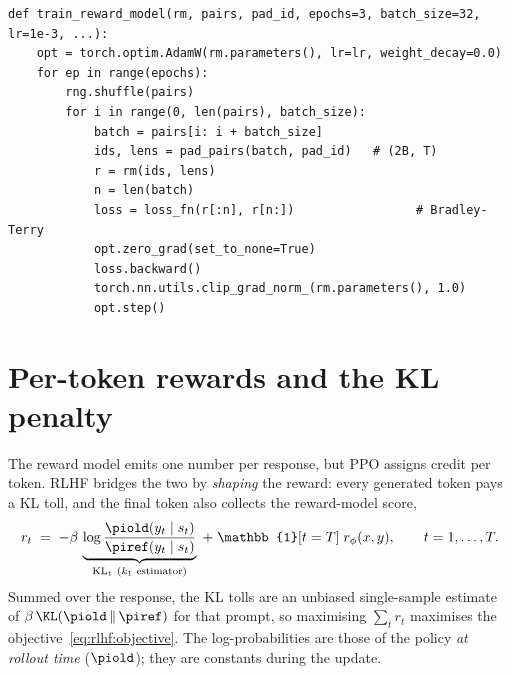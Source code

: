 \begin{lstlisting}[caption={Training the reward model on stacked pairs (\ident{llmsys/rlhf/ppo.py}, abridged).},label={lst:rlhf:rmtrain}]
def train_reward_model(rm, pairs, pad_id, epochs=3, batch_size=32, lr=1e-3, ...):
    opt = torch.optim.AdamW(rm.parameters(), lr=lr, weight_decay=0.0)
    for ep in range(epochs):
        rng.shuffle(pairs)
        for i in range(0, len(pairs), batch_size):
            batch = pairs[i: i + batch_size]
            ids, lens = pad_pairs(batch, pad_id)   # (2B, T)
            r = rm(ids, lens)
            n = len(batch)
            loss = loss_fn(r[:n], r[n:])                 # Bradley-Terry
            opt.zero_grad(set_to_none=True)
            loss.backward()
            torch.nn.utils.clip_grad_norm_(rm.parameters(), 1.0)
            opt.step()
\end{lstlisting}

\section{Per-token rewards and the KL penalty}\label{sec:rlhf:kl}

The reward model emits one number per response, but PPO assigns credit per token. RLHF bridges the two by
\emph{shaping} the reward: every generated token pays a KL toll, and the final token also collects the
reward-model score,
\begin{equation}
  r_t \;=\; -\beta\,\underbrace{\log\frac{\piold(y_t\mid s_t)}{\piref(y_t\mid s_t)}}_{\text{KL}_t\ (k_1\text{ estimator})}
  \;+\; \mathbb{1}[t = T]\; r_\phi(x, y),
  \qquad t = 1,\dots,T.
  \label{eq:rlhf:shaped}
\end{equation}
Summed over the response, the KL tolls are an unbiased single-sample estimate of
$\beta\,\KL(\piold\,\|\,\piref)$ for that prompt, so maximising $\sum_t r_t$ maximises the
objective~\eqref{eq:rlhf:objective}. The log-probabilities are those of the
policy \emph{at rollout time} ($\piold$); they are constants during the update.

